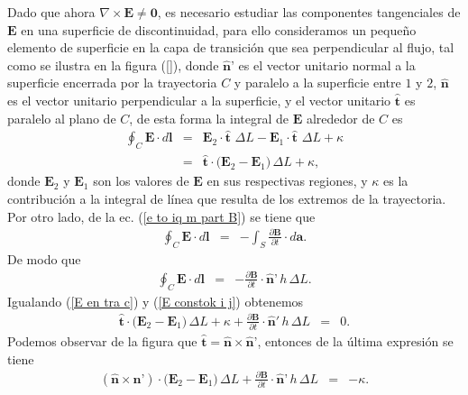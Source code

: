 Dado que ahora $\nabla\times\textbf{E}\neq \textbf{0}$, es necesario estudiar las componentes tangenciales de $\textbf{E}$ en una superficie de discontinuidad, para ello consideramos un peque\~no elemento de superficie en la capa de transici\'on que sea perpendicular al flujo, tal como se ilustra en la figura (\ref{}), donde $\hat{\textbf{n}}\textbf{'}$ es el vector unitario normal a la superficie encerrada por la trayectoria $C$ y paralelo a la superficie entre $1$ y $2$, $\hat{\textbf{n}}$ es el vector unitario perpendicular a la  superficie, y el vector unitario $\hat{\textbf{t}}$ es paralelo al plano de $C$, de esta forma la integral de $\textbf{E}$ alrededor de $C$ es
\begin{eqnarray}
\oint_C\textbf{E}\cdot d\textbf{l}&=&\textbf{E}_2\cdot\hat{\textbf{t}}\,\,\Delta L-\textbf{E}_1\cdot\hat{\textbf{t}}\,\,\Delta L+ \kappa\nonumber\\
&=&\hat{\textbf{t}}\cdot\big(\textbf{E}_2-\textbf{E}_1\big)\,\Delta L+\kappa,\label{E en tra c}
\end{eqnarray}
donde $\textbf{E}_2$ y $\textbf{E}_1$ son los valores de $\textbf{E}$ en sus respectivas regiones, y $\kappa$ es la contribuci\'on a la integral de l\'inea que resulta de los extremos de la trayectoria.
Por otro lado, de la ec. (\ref{e to iq m part B}) se tiene que
\begin{eqnarray}
\oint_C\textbf{E}\cdot d\textbf{l}&=&-\int_S\frac{\partial\textbf{B}}{\partial t}\cdot d\textbf{a}.
\end{eqnarray}
De modo que
\begin{eqnarray}
\oint_C\textbf{E}\cdot d\textbf{l}&=&-\frac{\partial\textbf{B}}{\partial t}\cdot\hat{\textbf{n}}\textbf{'}\,h\,\Delta L.\label{E constok i j}
\end{eqnarray}
Igualando (\ref{E en tra c}) y (\ref{E constok i j}) obtenemos
\begin{eqnarray}
\hat{\textbf{t}}\cdot\big(\textbf{E}_2-\textbf{E}_1\big)\,\Delta L+\kappa+\frac{\partial\textbf{B}}{\partial t}\cdot\hat{\textbf{n}}'\,h\,\Delta L&=&0.
\end{eqnarray}
Podemos observar de la figura que $\hat{\textbf{t}}=\hat{\textbf{n}}\times\hat{\textbf{n}}\textbf{'}$, entonces de la \'ultima expresi\'on se tiene
\begin{eqnarray}
(\hat{\textbf{n}}\times\hat{\textbf{n}}\textbf{'})\cdot\big(\textbf{E}_2-\textbf{E}_1\big)\,\Delta L+\frac{\partial\textbf{B}}{\partial t}\cdot\hat{\textbf{n}}\textbf{'}\,h\,\Delta L&=&-\kappa.
\end{eqnarray}
